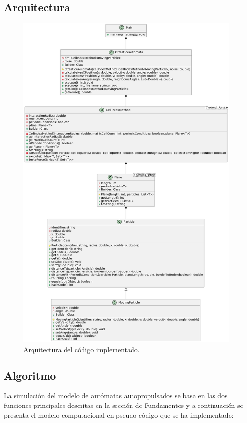 \documentclass[11pt]{article}
\begin{document}
        \subsection{Arquitectura}

            \begin{figure}[htbp]
                \centering
                \includegraphics[height=0.69\textheight]{./Architecture.png}
                \caption{Arquitectura del código implementado.}
                \label{fig:my_png}
            \end{figure}

        \subsection{Algoritmo}
            La simulación del modelo de autómatas autopropulsados se basa en las dos funciones principales descritas en la sección
            de Fundamentos y a continuación se presenta el modelo computacional en pseudo-código que se ha implementado:
\end{document}
